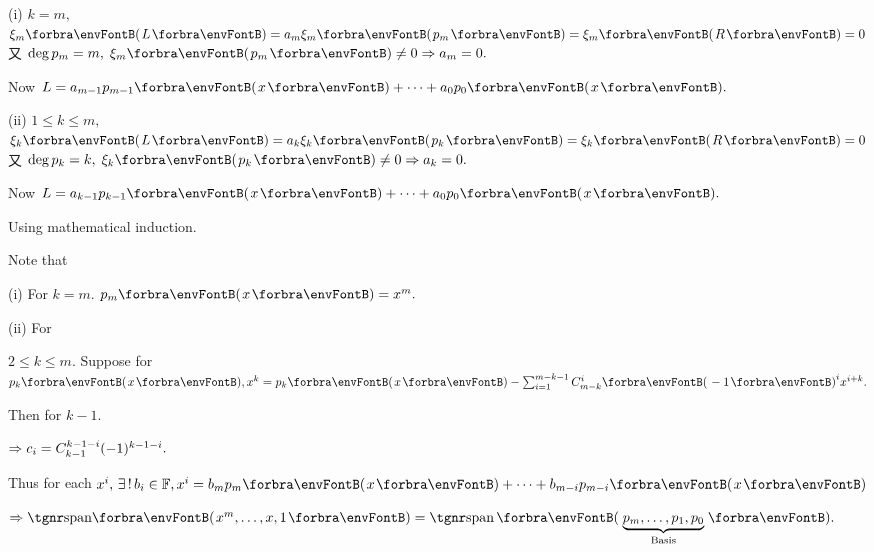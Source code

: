 \documentclass[a4paper, 11pt, UTF8]{article}
\begin{document}
\begin{large}
(i) {\Large\vspace{4pt}$k=m,$ \;$\xi_{m}\Par{L}=a_{m}\xi_{m}\Par{p_m}=\xi_{m}\Par{R}=0$ 又 $\deg p_m=m,\;\xi_{m}\Par{p_m}\neq 0\Rightarrow a_m=0.$}\par\quad\Hi
{\Large\vspace{8pt}Now $L=a_{m-1}p_{m-1}\Par{x}+\dots+a_0p_0\Par{x}.$}\par\quad\Endi
(ii) {\Large\vspace{4pt}$1\leqslant k\leqslant m,$ \;$\xi_{k}\Par{L}=a_{k}\xi_{k}\Par{p_k}=\xi_{k}\Par{R}=0$ 又 $\deg p_k=k,\;\xi_{k}\Par{p_k}\neq 0\Rightarrow a_k=0.$}\par\quad\Hii
{\Large Now $L=a_{k-1}p_{k-1}\Par{x}+\dots+a_0p_0\Par{x}.$}\PfEnd
\SepLine

Using mathematical induction.\par\quad
Note that \vspace{-8pt} \par\quad
(i) For $k=m.$ \;$p_m\Par{x}=x^m.$\par\quad\Endi
(ii) For {\Large$2\leqslant k\leqslant m.$ {\large Suppose for} $p_{k}\Par{x},x^{k}=p_{k}\Par{x}-\sum_{i=1}^{m-k-1}\mathC_{m-k}^i \Par{-1}^{i}x^{i+k}.$\par}\quad\Hii
{\Large {\large Then for $k-1.\;$}\par}\quad\Hii
{\Large\par}\vspace{4pt}\quad\Hii
{\Large$\Rightarrow c_{i}=C_{k-1}^{k-1-i}(-1)^{k-1-i}.$\par}\quad\Hii
{\Large {\large Thus for each} $x^i,\,\exists\,!\,b_i\in\Fbb,x^i=b_m p_m\Par{x}+\dots+b_{m-i}p_{m-i}\Par{x}$\par}\quad\Hii
{\Large$\Rightarrow\Span{x^m,\dots,x,1}=\Spn\Par{\underbrace{p_m,\dots,p_1,p_0}_\text{Basis}}.$}\large\PfEnd\vspace{10pt}\quad

\end{large}
\end{document}
